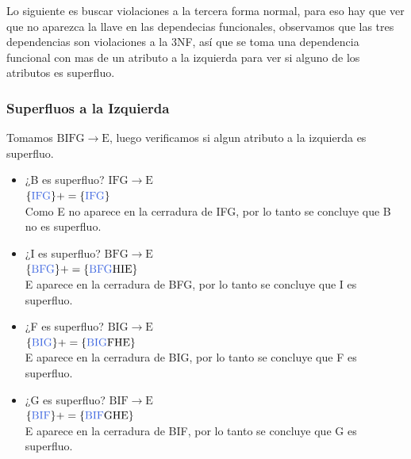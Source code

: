 \documentclass[10pt]{article}
\begin{document}
Lo siguiente es buscar violaciones a la tercera forma normal, para eso hay que ver que no aparezca la llave en las dependecias funcionales, observamos que las tres dependencias son violaciones a la 3NF, así que se toma una dependencia funcional con mas de un atributo a la izquierda para ver si alguno de los atributos es superfluo.\\

\subsubsection{Superfluos a la Izquierda}
\noindent Tomamos $\mathrm{BIFG \rightarrow E}$, luego verificamos si algun atributo a la izquierda es superfluo. \\
\begin{itemize}


\item ¿B es superfluo? $\mathrm{IFG \rightarrow E}$\\

$\mathrm{\{\textcolor{RoyalBlue}{IFG}\}+= \{\textcolor{RoyalBlue}{IFG}\}}$\\
 	
Como E no aparece en la cerradura de IFG, por lo tanto se concluye que B no es superfluo.\\

\item ¿I es superfluo? $\mathrm{BFG \rightarrow E}$\\

$\mathrm{\{\textcolor{RoyalBlue}{BFG}\}+= \{\textcolor{RoyalBlue}{BFG}HIE\}}$\\

E aparece en la cerradura de BFG, por lo tanto se concluye que I es superfluo.\\

\item ¿F es superfluo? $\mathrm{BIG \rightarrow E}$\\

$\mathrm{\{\textcolor{RoyalBlue}{BIG}\}+= \{\textcolor{RoyalBlue}{BIG}FHE\}}$\\

E aparece en la cerradura de BIG, por lo tanto se concluye que F es superfluo.\\

\item ¿G es superfluo? $\mathrm{BIF \rightarrow E}$\\

$\mathrm{\{\textcolor{RoyalBlue}{BIF}\}+= \{\textcolor{RoyalBlue}{BIF}GHE\}}$\\

E aparece en la cerradura de BIF, por lo tanto se concluye que G es superfluo.\\

\end{itemize}
\end{document}
